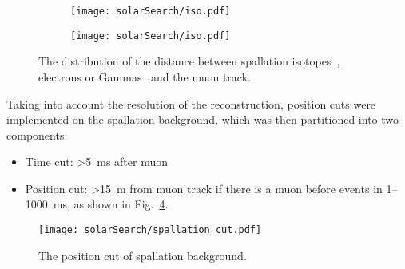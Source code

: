 \begin{figure}[htbp]
	\centering
	\begin{subfigure}{0.5\textwidth}
		\centering
		\texttt{[image: solarSearch/iso.pdf]}
		\caption{}
		\label{fig:solar_isotops}
	\end{subfigure}%
	\begin{subfigure}{0.5\textwidth}
		\centering
		\texttt{[image: solarSearch/iso.pdf]}
		\caption{}
		\label{fig:solar_gamma_electron}
	\end{subfigure}
	\caption{The distribution of the distance between spallation isotopes~,  electrons  or Gammas~ and the muon track.}
	\label{fig:solar_isotops_all}
\end{figure}
Taking into account the resolution of the reconstruction, position cuts were implemented on the spallation background, which was then partitioned into two components:
\begin{itemize}
	\item Time cut: >\SI{5}{ms} after muon
	\item Position cut: >\SI{15}{m} from muon track if there is a muon before events in 1--\SI{1000}{ms}, as shown in Fig.~\ref{fig:solar_spallation_cut}.
\end{itemize}

\begin{figure}[htbp]
	\centering
	\texttt{[image: solarSearch/spallation\_cut.pdf]}
	\caption{The position cut of spallation background.}
	\label{fig:solar_spallation_cut}
\end{figure}

